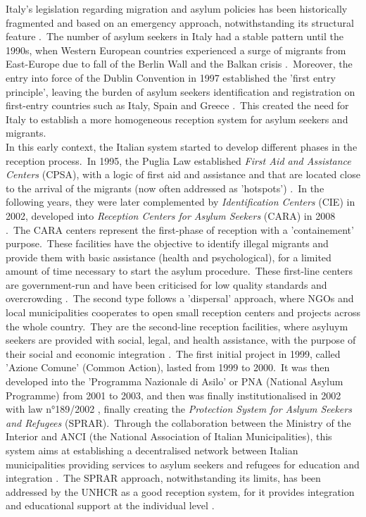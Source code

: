 \documentclass[authoryear,preprint,review,12pt]{elsarticle}
\begin{document}
\noindent
Italy's legislation regarding migration and asylum policies has been historically fragmented and based on an emergency approach, notwithstanding its structural feature \citep{marchetti2014}.\ The number of asylum seekers in Italy had a stable pattern until the 1990s, when Western European countries experienced a surge of migrants from East-Europe due to fall of the Berlin Wall and the Balkan crisis \citep{anci2005}.\ Moreover, the entry into force of the Dublin Convention in 1997 established the 'first entry principle', leaving the burden of asylum seekers identification and registration on first-entry countries such as Italy, Spain and Greece \citep{lott2023}.\ This created the need for Italy to establish a more homogeneous reception system for asylum seekers and migrants.\\

\noindent
In this early context, the Italian system started to develop different phases in the reception process.\ In 1995, the Puglia Law established \textit{First Aid and Assistance Centers} (CPSA), with a logic of first aid and assistance and that are located close to the arrival of the migrants (now often addressed as 'hotspots') \citep{ricardguay2019}.\ In the following years, they were later complemented by \textit{Identification Centers} (CIE) in 2002, developed into \textit{Reception Centers for Asylum Seekers} (CARA) in 2008 \citep{campesi2018}.\ The CARA centers represent the first-phase of reception with a 'containement' purpose.\ These facilities have the objective to identify illegal migrants and provide them with basic assistance (health and psychological), for a limited amount of time necessary to start the asylum procedure.\ These first-line centers are government-run and have been criticised for low quality standards and overcrowding \citep{ricardguay2019}.\ The second type follows a 'dispersal' approach, where NGOs and local municipalities cooperates to open small reception centers and projects across the whole country.\ They are the second-line reception facilities, where asyluym seekers are provided with social, legal, and health assistance, with the purpose of their social and economic integration \citep{catarci2016}.\ The first initial project in 1999, called 'Azione Comune' (Common Action), lasted from 1999 to 2000.\ It was then developed into the 'Programma Nazionale di Asilo' or PNA (National Asylum Programme) from 2001 to 2003, and then was finally institutionalised in 2002 with law n°189/2002 \citep{bossifini2002}, finally creating the \textit{Protection System for Aslyum Seekers and Refugees} (SPRAR).\ Through the collaboration between the Ministry of the Interior and ANCI (the National Association of Italian Municipalities), this system aims at establishing a decentralised network between Italian municipalities providing services to asylum seekers and refugees for education and integration \citep{anci2005}.\ The SPRAR approach, notwithstanding its limits, has been addressed by the UNHCR as a good reception system, for it provides integration and educational support at the individual level \citep{catarci2016}.\\ 
\end{document}
